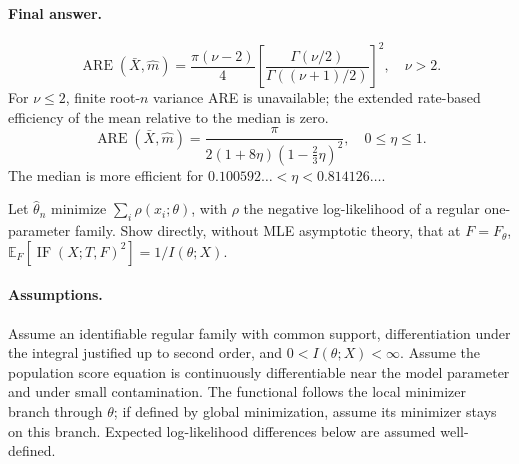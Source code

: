 \documentclass[answers,12pt,addpoints]{exam}
\providecommand{\E}{\mathbb{E}}
\providecommand{\IF}{\operatorname{IF}}
\providecommand{\ARE}{\operatorname{ARE}}
\begin{document}
\begin{questions}
\begin{solution}

\paragraph{Final answer.}
\[
\boxed{\ARE(\bar X,\widehat m)
=\frac{\pi(\nu-2)}4
\left[\frac{\Gamma(\nu/2)}{\Gamma((\nu+1)/2)}\right]^2,
\quad\nu>2.}
\]
For $\nu\leq2$, finite root-$n$ variance ARE is unavailable; the
extended rate-based efficiency of the mean relative to the median
is zero.
\[
\boxed{\ARE(\bar X,\widehat m)
=\frac\pi{2(1+8\eta)(1-\frac23\eta)^2},\quad0\leq\eta\leq1.}
\]
The median is more efficient for
$0.100592\ldots<\eta<0.814126\ldots$.
\end{solution}

\question
Let $\widehat\theta_n$ minimize $\sum_i\rho(x_i;\theta)$, with
$\rho$ the negative log-likelihood of a regular one-parameter family.
Show directly, without MLE asymptotic theory, that at $F=F_\theta$,
$\E_F[\IF(X;T,F)^2]=1/I(\theta;X)$.

\begin{solution}
\paragraph{Assumptions.}
Assume an identifiable regular family with common support,
differentiation under the integral justified up to second order,
and $0<I(\theta;X)<\infty$. Assume the population score equation
is continuously differentiable near the model parameter and under
small contamination. The functional follows the local minimizer
branch through $\theta$; if defined by global minimization, assume
its minimizer stays on this branch. Expected log-likelihood
differences below are assumed well-defined.


\end{solution}
\end{questions}
\end{document}
